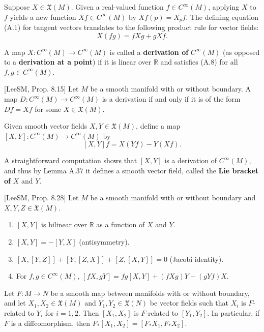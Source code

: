 Suppose $X \in \mathfrak{X}(M)$. Given a real-valued function $f \in C^\infty(M)$, applying $X$ to $f$ yields a new function $Xf \in C^\infty(M)$ by $Xf(p) = X_p f$. The defining equation (A.1) for tangent vectors translates to the following product rule for vector fields:
\begin{equation}
X(fg) = f Xg + g Xf.
\tag{A.8}
\end{equation}

A map $X : C^\infty(M) \to C^\infty(M)$ is called a \textbf{derivation of } $C^\infty(M)$ (as opposed to a \textbf{derivation at a point}) if it is linear over $\mathbb{R}$ and satisfies (A.8) for all $f, g \in C^\infty(M)$.

\begin{lemma}
\label{lem:derivation-characterization}
[LeeSM, Prop. 8.15] Let $M$ be a smooth manifold with or without boundary. A map $D : C^\infty(M) \to C^\infty(M)$ is a derivation if and only if it is of the form $Df = Xf$ for some $X \in \mathfrak{X}(M)$.
\end{lemma}

Given smooth vector fields $X, Y \in \mathfrak{X}(M)$, define a map $[X, Y] : C^\infty(M) \to C^\infty(M)$ by
\[
[X, Y]f = X(Yf) - Y(Xf).
\]

A straightforward computation shows that $[X, Y]$ is a derivation of $C^\infty(M)$, and thus by Lemma A.37 it defines a smooth vector field, called the \textbf{Lie bracket of } $X$ and $Y$.

\begin{proposition}
\label{prop:lie-bracket-properties}
[LeeSM, Prop. 8.28] Let $M$ be a smooth manifold with or without boundary and $X, Y, Z \in \mathfrak{X}(M)$.
\begin{enumerate}[label=(\alph*)]
\item $[X, Y]$ is bilinear over $\mathbb{R}$ as a function of $X$ and $Y$.
\item $[X, Y] = -[Y, X]$ (antisymmetry).
\item $[X, [Y, Z]] + [Y, [Z, X]] + [Z, [X, Y]] = 0$ (Jacobi identity).
\item For $f, g \in C^\infty(M)$, $[fX, gY] = fg[X, Y] + (fXg)Y - (gYf)X$.
\end{enumerate}
\end{proposition}

\begin{proposition}
\label{prop:naturality-of-lie-brackets}

Let $F : M \to N$ be a smooth map between manifolds with or without boundary, and let $X_1, X_2 \in \mathfrak{X}(M)$ and $Y_1, Y_2 \in \mathfrak{X}(N)$ be vector fields such that $X_i$ is $F$-related to $Y_i$ for $i = 1, 2$. Then $[X_1, X_2]$ is $F$-related to $[Y_1, Y_2]$. In particular, if $F$ is a diffeomorphism, then $F_*[X_1, X_2] = [F_* X_1, F_* X_2]$.
\end{proposition}

